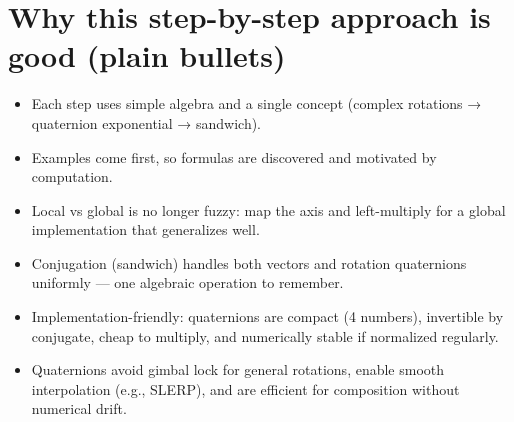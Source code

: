\documentclass[11pt]{article}
\begin{document}
\section{Why this step-by-step approach is good (plain bullets)}
\begin{itemize}
  \item Each step uses simple algebra and a single concept (complex rotations → quaternion exponential → sandwich).
  \item Examples come first, so formulas are discovered and motivated by computation.
  \item Local vs global is no longer fuzzy: map the axis and left-multiply for a global implementation that generalizes well.
  \item Conjugation (sandwich) handles both vectors and rotation quaternions uniformly — one algebraic operation to remember.
  \item Implementation-friendly: quaternions are compact (4 numbers), invertible by conjugate, cheap to multiply, and numerically stable if normalized regularly.
  \item Quaternions avoid gimbal lock for general rotations, enable smooth interpolation (e.g., SLERP), and are efficient for composition without numerical drift.
\end{itemize}
\end{document}
